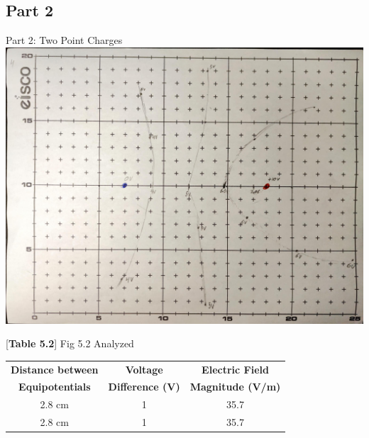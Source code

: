 \documentclass[titlepage]{article}
\begin{document}
	\subsection{Part 2} 
	\vspace{0.7cm}
	\begin{paracol}{2}
		\begin{minipage}[t]{0.5\textwidth}
			 Part 2: Two Point Charges
			\includegraphics[width=1\linewidth, frame]{part2}
		\end{minipage}
		\switchcolumn
		\begin{minipage}[c]{0.5\textwidth}
			\vspace{1.7cm}
			\begin{center}
			[\textbf{Table 5.2}] Fig 5.2 Analyzed
		\end{center}
			\begin{tabular}{c|c|c}
				\textbf{Distance between} & \textbf{Voltage} & \textbf{Electric Field} \\
				\textbf{Equipotentials} & \textbf{Difference (V)} & \textbf{Magnitude (V/m)}\\
				\hline
				2.8 cm & 1 & 35.7\\
				2.8 cm & 1 & 35.7
			\end{tabular}
		\end{minipage}
	\end{paracol}
	\vspace{3cm}
\end{document}
